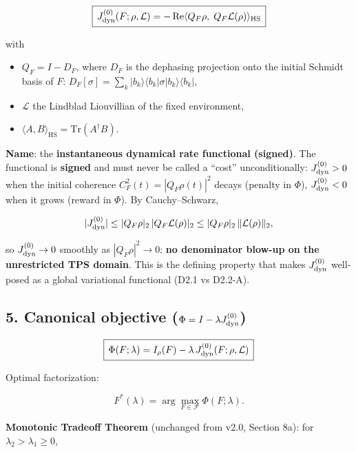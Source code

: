 \documentclass[
]{article}
\providecommand{\tightlist}{%
  \setlength{\itemsep}{0pt}\setlength{\parskip}{0pt}}
\begin{document}
\[
\boxed{\,
J_{\rm dyn}^{(0)}(F;\rho,\mathcal L)
= -\operatorname{Re}\langle Q_F\rho,\; Q_F\mathcal L(\rho)\rangle_{\mathrm{HS}}
\,}
\]

with

\begin{itemize}
\tightlist
\item
  \(Q_F = I - D_F\), where \(D_F\) is the dephasing projection onto the
  initial Schmidt basis of \(F\):
  \(D_F[\sigma] = \sum_k |b_k\rangle\langle b_k|
  \sigma |b_k\rangle\langle b_k|\),
\item
  \(\mathcal L\) the Lindblad Liouvillian of the fixed environment,
\item
  \(\langle A,B\rangle_{\mathrm{HS}} = \mathrm{Tr}(A^\dagger B)\).
\end{itemize}

\textbf{Name}: the \textbf{instantaneous dynamical rate functional
(signed)}. The functional is \textbf{signed} and must never be called a
``cost'' unconditionally: \(J_{\rm dyn}^{(0)} > 0\) when the initial
coherence \(C_F^2(t)=|Q_F\rho(t)|^2\) decays (penalty in \(\Phi\)),
\(J_{\rm dyn}^{(0)} < 0\) when it grows (reward in \(\Phi\)). By
Cauchy--Schwarz,

\[
|J_{\rm dyn}^{(0)}| \le |Q_F\rho|_2\, |Q_F\mathcal L(\rho)|_2 \le
|Q_F\rho|_2\, \|\mathcal L(\rho)\|_2,
\]

so \(J_{\rm dyn}^{(0)} \to 0\) smoothly as \(|Q_F\rho|^2 \to 0\):
\textbf{no denominator blow-up on the unrestricted TPS domain}. This is
the defining property that makes \(J_{\rm dyn}^{(0)}\) well-posed as a
global variational functional (D2.1 vs D2.2-A).

\subsection{\texorpdfstring{5. Canonical objective
(\(\Phi = I - \lambda J_{\rm dyn}^{(0)}\))}{5. Canonical objective (\textbackslash Phi = I - \textbackslash lambda J\_\{\textbackslash rm dyn\}\^{}\{(0)\})}}\label{canonical-objective-phi-i---lambda-j_rm-dyn0}

\[
\boxed{\,
\Phi(F;\lambda) = I_\rho(F) - \lambda\, J_{\rm dyn}^{(0)}(F;\rho,\mathcal L)
\,}
\]

Optimal factorization:

\[
F^*(\lambda) = \arg\max_{F\in\mathcal F} \Phi(F;\lambda).
\]

\textbf{Monotonic Tradeoff Theorem} (unchanged from v2.0, Section 8a):
for \(\lambda_2 > \lambda_1 \ge 0\),
\end{document}
